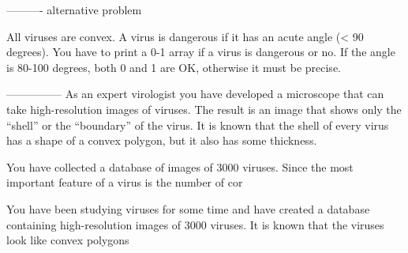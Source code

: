 ---------- alternative problem

All viruses are convex.
A virus is dangerous if it has an acute angle (< 90 degrees).
You have to print a 0-1 array if a virus is dangerous or no.
If the angle is 80-100 degrees, both 0 and 1 are OK, otherwise it must be precise.


---------------
As an expert virologist you have developed a microscope that can take high-resolution images of viruses.
The result is an image that shows only the ``shell'' or the ``boundary'' of the virus.
It is known that the shell of every virus has a shape of a convex polygon, but
it also has some thickness.

You have collected a database of images of 3000 viruses.
Since the most important feature of a virus is the number of cor


You have been studying viruses for some time and have created a
database containing high-resolution images of 3000 viruses.
It is known that the viruses look like convex polygons